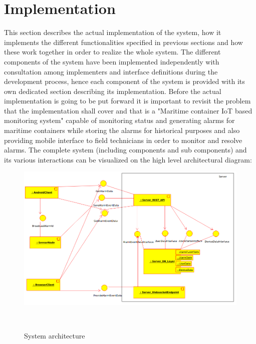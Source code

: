 \chapter{Implementation}
\label{cha:implementation}

This section describes the actual implementation of the system, how it implements the different functionalities specified in previous sections and how these work together in order to realize the whole system. The different components of the system have been implemented independently with consultation among implementers and interface definitions during the development process, hence each component of the system is provided with its own dedicated section describing its implementation. Before the actual implementation is going to be put forward it is important to revisit the problem that the implementation shall cover and that is a "Maritime container IoT based monitoring system" capable of monitoring status and generating alarms for maritime containers while storing the alarms for historical purposes and also providing mobile interface to field technicians in order to monitor and resolve alarms. The complete system (including components and sub components) and its various interactions can be visualized on the high level architectural diagram:


\begin{figure}[H]
\centering
\includegraphics[scale=0.47]{gfx/Architecture}
\caption{System architecture}~\label{fig:servercomm}
\end{figure}





\let\cleardoublepage\clearpage




